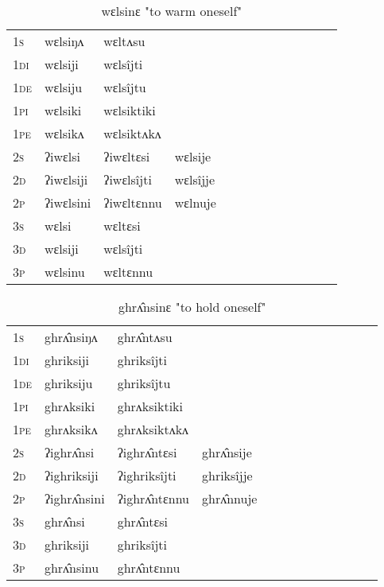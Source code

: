 \documentclass[oldfontcommands,oneside,a4paper,11pt]{article}
\begin{document}
\begin{table}[H]
\label{ɛl.vr} \centering 
\caption{wɛlsinɛ  "to warm oneself"  }
\begin{tabular}{l|l|l|l|l|l|l|l|l|l|l|l|l}  \toprule
\textsc{1s} &wɛlsiŋʌ &wɛltʌsu \\ 
\textsc{1di} &wɛlsiji &wɛlsîjti   \\
\textsc{1de} &wɛlsiju &wɛlsîjtu   \\ 
\textsc{1pi} &wɛlsiki &wɛlsiktiki   \\ 
\textsc{1pe} &wɛlsikʌ &wɛlsiktʌkʌ   \\ 
\textsc{2s} & ʔiwɛlsi & ʔiwɛltɛsi &wɛlsije  \\ 
\textsc{2d} & ʔiwɛlsiji & ʔiwɛlsîjti &wɛlsîjje    \\
\textsc{2p} & ʔiwɛlsini  & ʔiwɛltɛnnu &wɛlnuje  \\ 
\textsc{3s} & wɛlsi & wɛltɛsi   \\ 
\textsc{3d} & wɛlsiji & wɛlsîjti   \\ 
\textsc{3p} & wɛlsinu  & wɛltɛnnu \\ 
\bottomrule
\end{tabular}
\end{table}


\begin{table}[H]
\label{ik.vr} \centering 
\caption{ghrʌ̂nsinɛ  "to hold oneself"  }
\begin{tabular}{l|l|l|l|l|l|l|l|l|l|l|l|l}  \toprule
\textsc{1s} &ghrʌ̂nsiŋʌ &ghrʌ̂ntʌsu \\ 
\textsc{1di} &ghriksiji &ghriksîjti   \\
\textsc{1de} &ghriksiju &ghriksîjtu   \\ 
\textsc{1pi} &ghrʌksiki &ghrʌksiktiki   \\ 
\textsc{1pe} &ghrʌksikʌ &ghrʌksiktʌkʌ   \\ 
\textsc{2s} & ʔighrʌ̂nsi & ʔighrʌ̂ntɛsi &ghrʌ̂nsije  \\ 
\textsc{2d} & ʔighriksiji & ʔighriksîjti &ghriksîjje    \\
\textsc{2p} & ʔighrʌ̂nsini  & ʔighrʌ̂ntɛnnu &ghrʌ̂nnuje  \\ 
\textsc{3s} & ghrʌ̂nsi & ghrʌ̂ntɛsi   \\ 
\textsc{3d} & ghriksiji & ghriksîjti   \\ 
\textsc{3p} & ghrʌ̂nsinu  & ghrʌ̂ntɛnnu \\ 
\bottomrule
\end{tabular}
\end{table}
\end{document}
